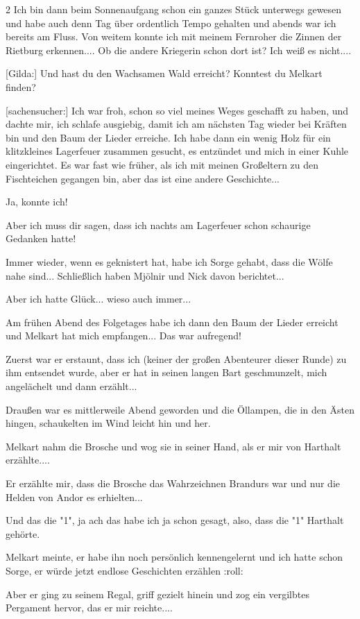 \documentclass[10pt, a4paper, oneside]{book}
\begin{document}
\begin{multicols}{2}
Ich bin dann beim Sonnenaufgang schon ein ganzes Stück unterwegs gewesen und habe auch denn Tag über ordentlich Tempo gehalten und abends war ich bereits am Fluss. Von weitem konnte ich mit meinem Fernroher die Zinnen der Rietburg erkennen.... Ob die andere Kriegerin schon dort ist? Ich weiß es nicht....

[Gilda:] Und hast du den Wachsamen Wald erreicht? Konntest du Melkart finden?

[sachensucher:] Ich war froh, schon so viel meines Weges geschafft zu haben, und dachte mir, ich schlafe ausgiebig, damit ich am nächsten Tag wieder bei Kräften bin und den Baum der Lieder erreiche. Ich habe dann ein wenig Holz für ein klitzkleines Lagerfeuer zusammen gesucht, es entzündet und mich in einer Kuhle eingerichtet. Es war fast wie früher, als ich mit meinen Großeltern zu den Fischteichen gegangen bin, aber das ist eine andere Geschichte...

Ja, konnte ich!

Aber ich muss dir sagen, dass ich nachts am Lagerfeuer schon schaurige Gedanken hatte!

Immer wieder, wenn es geknistert hat, habe ich Sorge gehabt, dass die Wölfe nahe sind... Schließlich haben Mjölnir und Nick davon berichtet...

Aber ich hatte Glück... wieso auch immer...

Am frühen Abend des Folgetages habe ich dann den Baum der Lieder erreicht und Melkart hat mich empfangen... Das war aufregend!

Zuerst war er erstaunt, dass ich (keiner der großen Abenteurer dieser Runde) zu ihm entsendet wurde, aber er hat in seinen langen Bart geschmunzelt, mich angelächelt und dann erzählt...

Draußen war es mittlerweile Abend geworden und die Öllampen, die in den Ästen hingen, schaukelten im Wind leicht hin und her.

Melkart nahm die Brosche und wog sie in seiner Hand, als er mir von Harthalt erzählte....

Er erzählte mir, dass die Brosche das Wahrzeichnen Brandurs war und nur die Helden von Andor es erhielten...

Und das die "1", ja ach das habe ich ja schon gesagt, also, dass die "1" Harthalt gehörte.

Melkart meinte, er habe ihn noch persönlich kennengelernt und ich hatte schon Sorge, er würde jetzt endlose Geschichten erzählen :roll:

Aber er ging zu seinem Regal, griff gezielt hinein und zog ein vergilbtes Pergament hervor, das er mir reichte....


\end{multicols}
\end{document}
